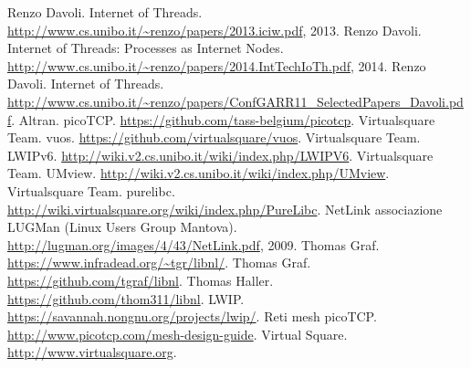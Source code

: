 
\begin{thebibliography}{90}             %
\rhead[\fancyplain{}{\bfseries \leftmark}]{\fancyplain{}{\bfseries
\thepage}}
 Renzo Davoli. Internet of Threads. \url{http://www.cs.unibo.it/~renzo/papers/2013.iciw.pdf}, 2013.
 Renzo Davoli. Internet of Threads: Processes as Internet Nodes. \url{http://www.cs.unibo.it/~renzo/papers/2014.IntTechIoTh.pdf}, 2014.
 Renzo Davoli. Internet of Threads. \url{http://www.cs.unibo.it/~renzo/papers/ConfGARR11_SelectedPapers_Davoli.pdf}.
 Altran. picoTCP. \url{https://github.com/tass-belgium/picotcp}.
 Virtualsquare Team. vuos. \url{https://github.com/virtualsquare/vuos}.
 Virtualsquare Team. LWIPv6. \url{http://wiki.v2.cs.unibo.it/wiki/index.php/LWIPV6}.
 Virtualsquare Team. UMview. \url{http://wiki.v2.cs.unibo.it/wiki/index.php/UMview}.
 Virtualsquare Team. purelibc. \url{http://wiki.virtualsquare.org/wiki/index.php/PureLibc}.
 NetLink associazione LUGMan (Linux Users Group Mantova). \url{http://lugman.org/images/4/43/NetLink.pdf}, 2009.
 Thomas Graf. \url{https://www.infradead.org/~tgr/libnl/}.
 Thomas Graf. \url{https://github.com/tgraf/libnl}.
 Thomas Haller. \url{https://github.com/thom311/libnl}.
 LWIP. \url{https://savannah.nongnu.org/projects/lwip/}.
 Reti mesh picoTCP. \url{http://www.picotcp.com/mesh-design-guide}.
 Virtual Square. \url{http://www.virtualsquare.org}.
\end{thebibliography}
\clearpage{\pagestyle{empty}\cleardoublepage}
